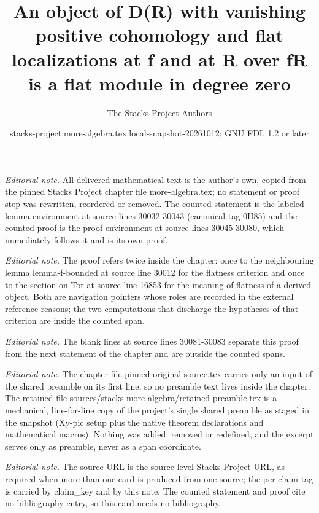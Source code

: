 \documentclass[10pt,a4paper]{amsart}
\title{An object of D(R) with vanishing positive cohomology and flat localizations at f and at R over fR is a flat module in degree zero}
\author{The Stacks Project Authors}
\date{stacks-project:more-algebra.tex:local-snapshot-20261012; GNU FDL 1.2 or later}
\theoremstyle{plain}
\theoremstyle{definition}
\theoremstyle{remark}
\numberwithin{equation}{subsection}
\begin{document}
\maketitle
\setcounter{subsection}{1}
\noindent\textit{Editorial note.} All delivered mathematical text is the author's own, copied from the pinned Stacks Project chapter file more-algebra.tex; no statement or proof step was rewritten, reordered or removed. The counted statement is the labeled lemma environment at source lines 30032-30043 (canonical tag 0H85) and the counted proof is the proof environment at source lines 30045-30080, which immediately follows it and is its own proof.\par\medskip
\noindent\textit{Editorial note.} The proof refers twice inside the chapter: once to the neighbouring lemma lemma-f-bounded at source line 30012 for the flatness criterion and once to the section on Tor at source line 16853 for the meaning of flatness of a derived object. Both are navigation pointers whose roles are recorded in the external reference reasons; the two computations that discharge the hypotheses of that criterion are inside the counted span.\par\medskip
\noindent\textit{Editorial note.} The blank lines at source lines 30081-30083 separate this proof from the next statement of the chapter and are outside the counted spans.\par\medskip
\noindent\textit{Editorial note.} The chapter file pinned-original-source.tex carries only an input of the shared preamble on its first line, so no preamble text lives inside the chapter. The retained file sources/stacks-more-algebra/retained-preamble.tex is a mechanical, line-for-line copy of the project's single shared preamble as staged in the snapshot (Xy-pic setup plus the native theorem declarations and mathematical macros). Nothing was added, removed or redefined, and the excerpt serves only as preamble, never as a span coordinate.\par\medskip
\noindent\textit{Editorial note.} The source URL is the source-level Stacks Project URL, as required when more than one card is produced from one source; the per-claim tag is carried by claim\_key and by this note. The counted statement and proof cite no bibliography entry, so this card needs no bibliography.\par\medskip
\end{document}
